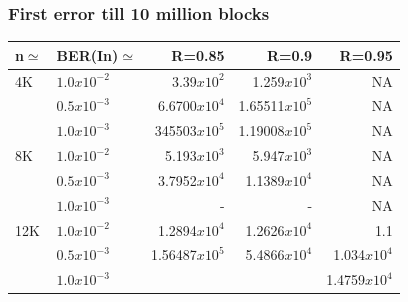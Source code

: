 \documentclass[xcolor=dvipsname]
{beamer}
\begin{document}
\begin{frame}[t] 
\frametitle{First error till 10 million blocks}

\begin{table}[]
\centering
\begin{tabular}{|l|l|r|r|r|}
\hline
n$\simeq$   & BER(In)$\simeq$    & R=0.85  & R=0.9 & R=0.95 \\ \hline
4K  & $1.0x10^{-2}$        & 3.39$x10^{2}$           & 1.259$x10^{3}$        & NA      \\ 
    & $0.5x10^{-3}$        & 6.6700$x10^{4}$        & 1.65511$x10^{5}$               & NA   \\ 
    & $1.0x10^{-3}$        & 345503$x10^{5}$        & 1.19008$x10^{5}$        & NA  \\ \hline
8K  & $1.0x10^{-2}$        & 5.193$x10^{3}$         & 5.947$x10^{3}$         & NA      \\ 
    & $0.5x10^{-3}$        & 3.7952$x10^{4}$        & 1.1389$x10^{4}$          & NA  \\ 
    & $1.0x10^{-3}$        & -             			& -               		 & NA             \\ \hline
12K & $1.0x10^{-2}$        & 1.2894$x10^{4}$        & 1.2626$x10^{4}$     & 1.1      \\ 
    & $0.5x10^{-3}$        & 1.56487$x10^{5}$      & 5.4866$x10^{4}$     & 1.034$x10^{4}$    \\ 
    & $1.0x10^{-3}$        & 			  			 &            		& 1.4759$x10^{4}$   \\ \hline
      
\end{tabular}
\end{table}

\end{frame}

\end{document}
